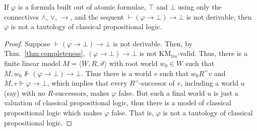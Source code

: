 \documentclass[envcountsect,envcountsame]{llncs}
\newcommand{\forces}{\Vdash}
\newcommand{\lcnxt}{\mathrm{KM}_{lin}}
\newcommand{\limp}{\rightarrow}
\newcommand{\rel}{R}
\newcommand{\releq}{R^{=}}
\newcommand{\seq}{\vdash}
\begin{document}
\begin{lemma}\label{lemma:double-negation-reverse}
  If
  $\varphi$
  is a formula built out of atomic formulae,
  $\top$ and
  $\bot$ using only the connectives
  $\land$,
  $\lor$,
  $\limp$, and 
  the sequent
  $\seq (\varphi \limp \bot) \limp \bot$
  is not derivable, then 
  $\varphi$ is not a tautology of classical propositional logic.
\end{lemma}
\begin{proof}
 Suppose
  $\seq (\varphi \limp \bot) \limp \bot$
  is not derivable. Then, by Thm.~\ref{thm:completeness}, 
  $(\varphi \limp \bot) \limp \bot$
  is not $\lcnxt$-valid. 
  Thus, there is a finite linear
  model 
  $M = \langle W, \rel, \vartheta \rangle$ with root world
  $w_0 \in W$ such that 
  $M, w_0 \not\forces (\varphi \limp \bot) \limp \bot$.
  Thus there is a world $v$ such that $w_0 \releq v$ and
  $M, v \forces \varphi \limp \bot$, which implies that every
  $\releq$-succesor of $v$, including a
  world $u$ (say) with no $R$-successors, makes $\varphi$ false. 
  But such a final world $u$ is just a valuation of classical
  propositional logic, thus there is a model of classical
  propositional logic which makes $\varphi$ false. That is,
  $\varphi$ is not a tautology of classical propositional logic.
\end{proof}
\end{document}
